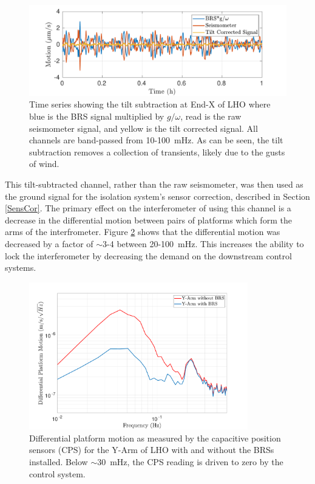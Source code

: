 \documentclass [12pt, proquest]{uwthesis}[2019]
\begin{document}
\begin{figure}[!h]
\begin{center}
\includegraphics[width=\textwidth]{TiltCorrTime.pdf}
\caption[Time series showing tilt subtraction ]{Time series showing the tilt subtraction at End-X of LHO where blue is the BRS signal multiplied by $g/\omega$, read is the raw seismometer signal, and yellow is the tilt corrected signal. All channels are band-passed from 10-100~mHz. As can be seen, the tilt subtraction removes a collection of transients, likely due to the gusts of wind.}
\label{subTime}
\end{center}
\end{figure}

This tilt-subtracted channel, rather than the raw seismometer, was then used as the ground signal for the isolation system's sensor correction, described in Section \ref{SensCor}. The primary effect on the interferometer of using this channel is a decrease in the differential motion between pairs of platforms which form the arms of the interfrometer. Figure \ref{armMotion} shows that the differential motion was decreased by a factor of $\sim$3-4 between 20-100~mHz. This increases the ability to lock the interferometer by decreasing the demand on the downstream control systems.

\begin{figure}[!h]
\begin{center}
\includegraphics[width=0.85\textwidth]{BRSArmMotion.pdf}
\caption[Differential platform motion ]{Differential platform motion as measured by the capacitive position sensors (CPS) for the Y-Arm of LHO with and without the BRSs installed. Below $\sim$30~mHz, the CPS reading is driven to zero by the control system.}
\label{armMotion}
\end{center}
\end{figure}
\end{document}
